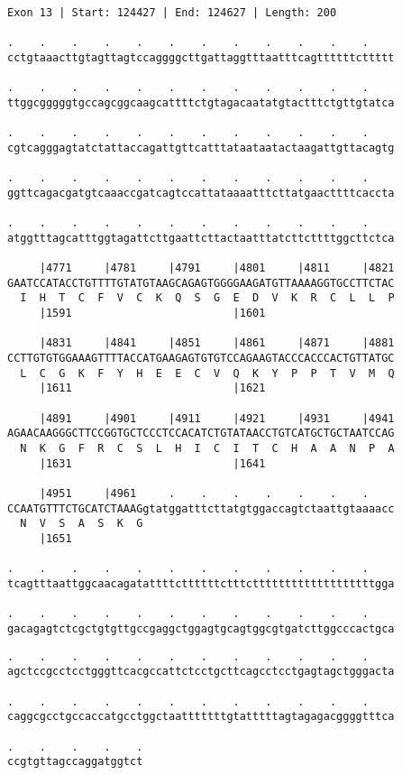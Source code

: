 \documentclass{article}
\begin{document}
\begin{Verbatim}[fontfamily=courier]
Exon 13 | Start: 124427 | End: 124627 | Length: 200

.    .    .    .    .    .    .    .    .    .    .    .    
cctgtaaacttgtagttagtccaggggcttgattaggtttaatttcagttttttcttttt

.    .    .    .    .    .    .    .    .    .    .    .    
ttggcgggggtgccagcggcaagcattttctgtagacaatatgtactttctgttgtatca

.    .    .    .    .    .    .    .    .    .    .    .    
cgtcagggagtatctattaccagattgttcatttataataatactaagattgttacagtg

.    .    .    .    .    .    .    .    .    .    .    .    
ggttcagacgatgtcaaaccgatcagtccattataaaatttcttatgaacttttcaccta

.    .    .    .    .    .    .    .    .    .    .    .    
atggtttagcatttggtagattcttgaattcttactaatttatcttcttttggcttctca

     |4771     |4781     |4791     |4801     |4811     |4821
GAATCCATACCTGTTTTGTATGTAAGCAGAGTGGGGAAGATGTTAAAAGGTGCCTTCTAC
  I  H  T  C  F  V  C  K  Q  S  G  E  D  V  K  R  C  L  L  P
     |1591                         |1601                    

     |4831     |4841     |4851     |4861     |4871     |4881
CCTTGTGTGGAAAGTTTTACCATGAAGAGTGTGTCCAGAAGTACCCACCCACTGTTATGC
  L  C  G  K  F  Y  H  E  E  C  V  Q  K  Y  P  P  T  V  M  Q
     |1611                         |1621                    

     |4891     |4901     |4911     |4921     |4931     |4941
AGAACAAGGGCTTCCGGTGCTCCCTCCACATCTGTATAACCTGTCATGCTGCTAATCCAG
  N  K  G  F  R  C  S  L  H  I  C  I  T  C  H  A  A  N  P  A
     |1631                         |1641                    

     |4951     |4961     .    .    .    .    .    .    .    
CCAATGTTTCTGCATCTAAAGgtatggatttcttatgtggaccagtctaattgtaaaacc
  N  V  S  A  S  K  G                                       
     |1651                                                  

.    .    .    .    .    .    .    .    .    .    .    .    
tcagtttaattggcaacagatattttcttttttctttctttttttttttttttttttgga

.    .    .    .    .    .    .    .    .    .    .    .    
gacagagtctcgctgtgttgccgaggctggagtgcagtggcgtgatcttggcccactgca

\end{Verbatim}
\newpage
\begin{Verbatim}[fontfamily=courier]
.    .    .    .    .    .    .    .    .    .    .    .    
agctccgcctcctgggttcacgccattctcctgcttcagcctcctgagtagctgggacta

.    .    .    .    .    .    .    .    .    .    .    .    
caggcgcctgccaccatgcctggctaatttttttgtatttttagtagagacggggtttca

.    .    .    .    .
ccgtgttagccaggatggtct
\end{Verbatim}
\end{document}
